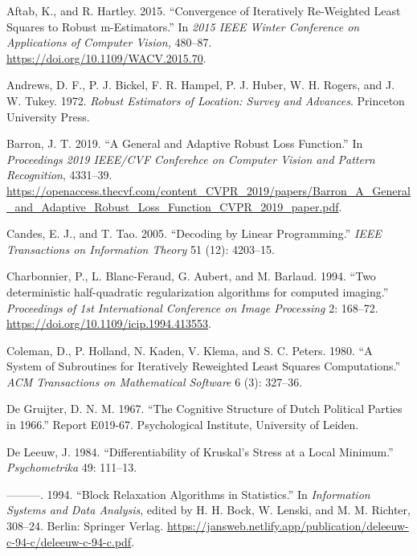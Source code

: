 \documentclass[
  12pt,
  letterpaper,
  DIV=11,
  numbers=noendperiod]{scrartcl}
\newlength{\cslhangindent}
\newenvironment{CSLReferences}[2] %
 {\begin{list}{}{%
  \setlength{\itemindent}{0pt}
  \setlength{\leftmargin}{0pt}
  \setlength{\parsep}{0pt}
  \ifodd #1
   \setlength{\leftmargin}{\cslhangindent}
   \setlength{\itemindent}{-1\cslhangindent}
  \fi
  \setlength{\itemsep}{#2\baselineskip}}}
 {\end{list}}
\theoremstyle{plain}
\theoremstyle{remark}
\begin{document}
\label{refs}
\begin{CSLReferences}{1}{0}
Aftab, K., and R. Hartley. 2015. {``Convergence of Iteratively
Re-Weighted Least Squares to Robust m-Estimators.''} In \emph{2015 IEEE
Winter Conference on Applications of Computer Vision,} 480--87.
\url{https://doi.org/10.1109/WACV.2015.70}.

Andrews, D. F., P. J. Bickel, F. R. Hampel, P. J. Huber, W. H. Rogers,
and J. W. Tukey. 1972. \emph{Robust Estimators of Location: Survey and
Advances}. Princeton University Press.

Barron, J. T. 2019. {``A General and Adaptive Robust Loss Function.''}
In \emph{Proceedings 2019 IEEE/CVF Conferehce on Computer Vision and
Pattern Recognition}, 4331--39.
\url{https://openaccess.thecvf.com/content_CVPR_2019/papers/Barron_A_General_and_Adaptive_Robust_Loss_Function_CVPR_2019_paper.pdf}.

Candes, E. J., and T. Tao. 2005. {``Decoding by Linear Programming.''}
\emph{IEEE Transactions on Information Theory} 51 (12): 4203--15.

Charbonnier, P., L. Blanc-Feraud, G. Aubert, and M. Barlaud. 1994.
{``{Two deterministic half-quadratic regularization algorithms for
computed imaging}.''} \emph{Proceedings of 1st International Conference
on Image Processing} 2: 168--72.
\url{https://doi.org/10.1109/icip.1994.413553}.

Coleman, D., P. Holland, N. Kaden, V. Klema, and S. C. Peters. 1980.
{``A System of Subroutines for Iteratively Reweighted Least Squares
Computations.''} \emph{ACM Transactions on Mathematical Software} 6 (3):
327--36.

De Gruijter, D. N. M. 1967. {``{The Cognitive Structure of Dutch
Political Parties in 1966}.''} Report E019-67. Psychological Institute,
University of Leiden.

De Leeuw, J. 1984. {``{Differentiability of Kruskal's Stress at a Local
Minimum}.''} \emph{Psychometrika} 49: 111--13.

---------. 1994. {``{Block Relaxation Algorithms in Statistics}.''} In
\emph{Information Systems and Data Analysis}, edited by H. H. Bock, W.
Lenski, and M. M. Richter, 308--24. Berlin: Springer Verlag.
\url{https://jansweb.netlify.app/publication/deleeuw-c-94-c/deleeuw-c-94-c.pdf}.


\end{CSLReferences}
\end{document}
